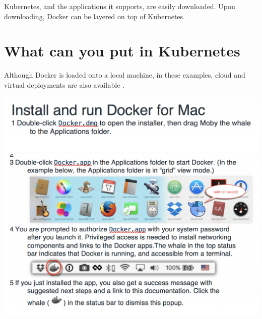 \documentclass[12pt, letterpaper]{article}
\begin{document}
Kubernetes, and the applications it supports, are easily downloaded.  Upon downloading, Docker can be layered on top of Kubernetes.  

\section *{What can you put in Kubernetes}

Although Docker is loaded onto a local machine, in these examples, cloud and virtual deployments are also available \cite{hid-sp18-525-docker}.

\includegraphics[width=1\textwidth, right]{Install Docker.png}
\includegraphics[width=1\textwidth, right]{Install Docker2.png}
\end{document}
